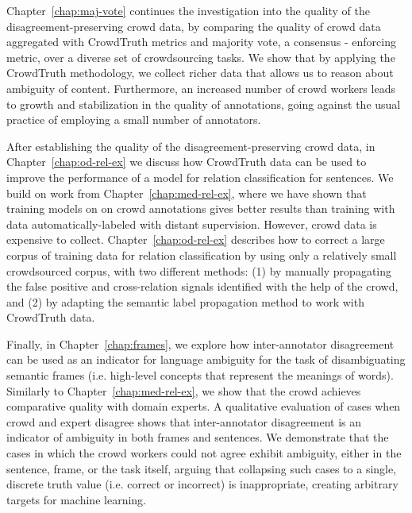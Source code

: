 Chapter~\ref{chap:maj-vote} continues the investigation into the quality of the disagreement-preserving crowd data, by comparing the quality of crowd data aggregated with CrowdTruth metrics and majority vote, a consensus - enforcing metric, over a diverse set of crowdsourcing tasks. We show that by applying the CrowdTruth methodology, we collect richer data that allows us to reason about ambiguity of content. Furthermore, an increased number of crowd workers leads to growth and stabilization in the quality of annotations, going against the usual practice of employing a small number of annotators.

After establishing the quality of the disagreement-preserving crowd data, in Chapter~\ref{chap:od-rel-ex} we discuss how CrowdTruth data can be used to improve the performance of a model for relation classification for sentences. We build on work from Chapter~\ref{chap:med-rel-ex}, where we have shown that training models on on crowd annotations gives better results than training with data automatically-labeled with distant supervision. However, crowd data is expensive to collect. Chapter~\ref{chap:od-rel-ex} describes how to correct a large corpus of training data for relation classification by using only a relatively small crowdsourced corpus, with two different methods: (1) by manually propagating the false positive and cross-relation signals identified with the help of the crowd, and (2) by adapting the semantic label propagation method to work with CrowdTruth data.

Finally, in Chapter~\ref{chap:frames}, we explore how inter-annotator disagreement can be used as an indicator for language ambiguity for the task of disambiguating semantic frames (i.e. high-level concepts that represent the meanings of words). Similarly to Chapter~\ref{chap:med-rel-ex}, we show that the crowd achieves comparative quality with domain experts. A qualitative evaluation of cases when crowd and expert disagree shows that inter-annotator disagreement is an indicator of ambiguity in both frames and sentences. We demonstrate that the cases in which the crowd workers could not agree exhibit ambiguity, either in the sentence, frame, or the task itself, arguing that collapsing such cases to a single, discrete truth value (i.e. correct or incorrect) is inappropriate, creating arbitrary targets for machine learning.

